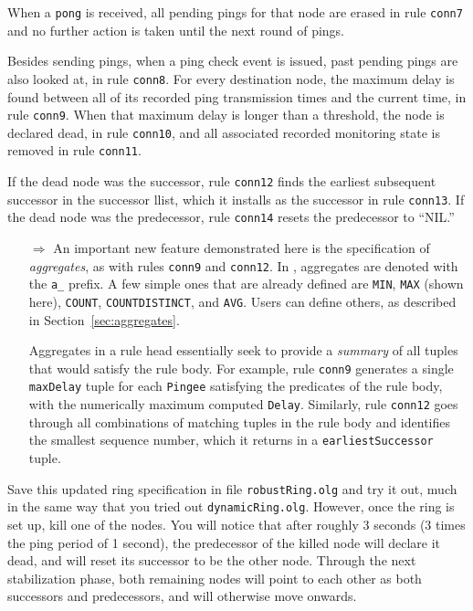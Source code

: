 \documentclass{article}
\begin{document}
When a \lstinline$pong$ is received, all pending pings for that node are
erased in rule \lstinline$conn7$ and no further action is taken until
the next round of pings.

Besides sending pings, when a ping check event is issued, past pending
pings are also looked at, in rule \lstinline$conn8$. For every
destination node, the maximum delay is found between all of its recorded
ping transmission times and the current time, in rule
\lstinline$conn9$. When that maximum delay is longer than a threshold,
the node is declared dead, in rule \lstinline$conn10$, and all
associated recorded monitoring state is removed in rule
\lstinline$conn11$.

If the dead node was the successor, rule \lstinline$conn12$ finds the
earliest subsequent successor in the successor llist, which it installs
as the successor in rule \lstinline$conn13$.  If the dead node was the
predecessor, rule \lstinline$conn14$ resets the predecessor to ``NIL.''

\begin{itemize}
\item[$\Longrightarrow$] An important new feature demonstrated here is
  the specification of \emph{aggregates}, as with rules
  \lstinline$conn9$ and \lstinline$conn12$.  In \ol, aggregates are
  denoted with the \texttt{a\_} prefix. A few simple ones that are
  already defined are \lstinline$MIN$, \lstinline$MAX$ (shown here),
  \lstinline$COUNT$, \lstinline$COUNTDISTINCT$, and
  \lstinline$AVG$. Users can define others, as described in
  Section~\ref{sec:aggregates}.

  Aggregates in a rule head essentially seek to provide a \emph{summary}
  of all tuples that would satisfy the rule body.  For example, rule
  \lstinline$conn9$ generates a single \lstinline$maxDelay$ tuple for
  each \lstinline$Pingee$ satisfying the predicates of the rule body,
  with the numerically maximum computed \lstinline$Delay$.  Similarly,
  rule \lstinline$conn12$ goes through all combinations of matching
  tuples in the rule body and identifies the smallest sequence number,
  which it returns in a \lstinline$earliestSuccessor$ tuple.
\end{itemize}

Save this updated ring specification in file \texttt{robustRing.olg} and
try it out, much in the same way that you tried out
\texttt{dynamicRing.olg}. However, once the ring is set up, kill one of
the nodes. You will notice that after roughly 3 seconds (3 times the
ping period of 1 second), the predecessor
of the killed node will declare it dead, and will reset its successor to
be the other node.  Through the next stabilization phase, both remaining
nodes will point to each other as both successors and predecessors, and
will otherwise move onwards.
\end{document}
